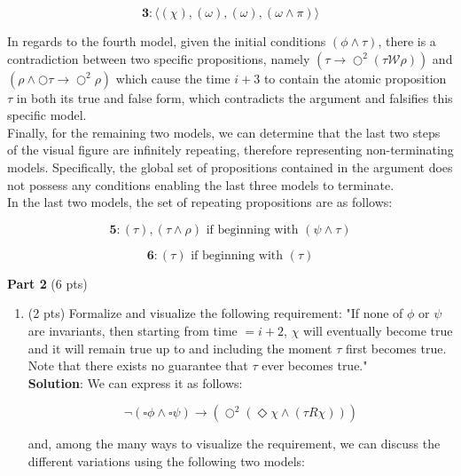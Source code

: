 \documentclass[12pt]{article}
\begin{document}
\begin{spacing}{1.5}
\begin{enumerate}
		      $$\textbf{3}: \langle (\chi), (\omega),(\omega),(\omega \land \pi) \rangle $$

		      In regards to the fourth model, given the initial conditions $(\phi \land \tau)$, there is a contradiction between two specific propositions, namely $(\tau \rightarrow \bigcirc^2(\tau \mathcal{W} \rho))$ and $(\rho \land \bigcirc \tau \rightarrow \bigcirc^2 \rho)$ which cause the time $i+3$ to contain the atomic proposition $\tau$ in both its true and false form, which contradicts the argument and falsifies this specific model.\\

		      Finally, for the remaining two models, we can determine that the last two steps of the visual figure are infinitely repeating, therefore representing non-terminating models. Specifically, the global set of propositions contained in the argument does not possess any conditions enabling the last three models to terminate.\\

		      In the last two models, the set of repeating propositions are as follows:

		      $$\textbf{5}: (\tau), (\tau \land \rho) \text{ if beginning with } (\psi \land \tau)$$

		      $$\textbf{6}: (\tau) \text{ if beginning with } (\tau)$$

	\end{enumerate}
						
	\textbf{Part 2} (6 pts)
						
	\begin{enumerate}
		\item (2 pts) Formalize and visualize the following requirement: "If none of $\phi$ or $\psi$ are invariants, then starting from time $=i+2$, $\chi$ will eventually become true and it will remain true up to and including the moment $\tau$ first becomes true. Note that there exists no guarantee that $\tau$ ever becomes true."\\

		      \textbf{Solution}: We can express it as follows:

		      $$\neg(\square \phi \land \square \psi)\rightarrow (\bigcirc^2 (\Diamond \chi \land (\tau R \chi)))$$

		      and, among the many ways to visualize the requirement, we can discuss the different variations using the following two models:

		      \begin{center}
\end{center}
\end{enumerate}
\end{spacing}
\end{document}
